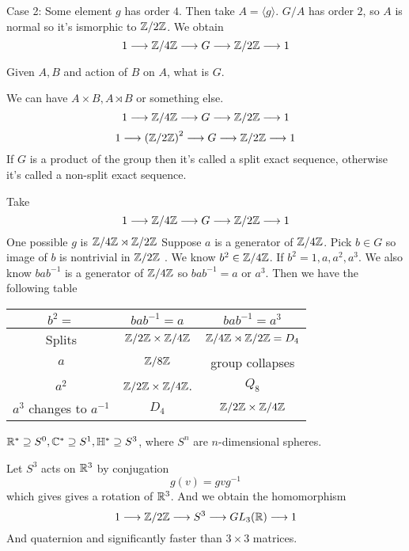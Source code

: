 Case 2: Some element $g$ has order $4$. Then take $A = \langle g \rangle$. $G/A$ has order $2$, so $A$ is normal so it's ismorphic to $\mathbb Z/ 2 \mathbb Z$. We obtain
\[ 1 \longrightarrow \mathbb Z/ 4 \mathbb Z \longrightarrow G \longrightarrow \mathbb Z/ 2 \mathbb Z \longrightarrow 1\]
\begin{problem}
	Given $A,B$ and action of $B$ on $A$, what is $G$.
\end{problem}
\begin{answer}
	We can have $A \times B, A \rtimes B$ or something else.
	\[ 1 \longrightarrow \mathbb Z/ 4 \mathbb Z \longrightarrow G \longrightarrow \mathbb Z/ 2 \mathbb Z \longrightarrow 1\]
	\[ 1 \longrightarrow \left( \mathbb Z/ 2 \mathbb Z \right)^2  \longrightarrow G \longrightarrow \mathbb Z/ 2 \mathbb Z \longrightarrow 1\]
	If $G$ is a product of the group then it's called a split exact sequence, otherwise it's called a non-split exact sequence.
\end{answer}
Take \[ 1 \longrightarrow  \mathbb Z/ 4 \mathbb Z   \longrightarrow G \longrightarrow \mathbb Z/ 2 \mathbb Z \longrightarrow 1\]
One possible $g$ is $\mathbb Z/ 4 \mathbb Z \rtimes \mathbb Z/ 2 \mathbb Z $
Suppose $a$ is a generator of $\mathbb Z/ 4 \mathbb Z$. Pick $b \in G$ so image of $b$ is nontrivial in $\mathbb Z/ 2 \mathbb Z $ . We know $b^2 \in \mathbb Z/ 4 \mathbb Z$. If $b^2 = 1,a,a^2,a^3$. We also know $bab^{-1}$ is a generator of $\mathbb Z/ 4 \mathbb Z$ so $bab^{-1} = a$ or $a^3$. Then we have the following table 


\begin{center}
	\begin{tabular}{c|c|c}
	$b^2 = $ & $bab^{-1} = a$ & $bab^{-1} = a^{3}$ \\
	\hline
	Splits & $\mathbb Z/ 2 \mathbb Z \times \mathbb Z/ 4 \mathbb Z$ & $\mathbb Z/ 4 \mathbb Z \rtimes \mathbb Z/ 2 \mathbb Z = D_4$ \\
	$a$ & $\mathbb Z/ 8 \mathbb Z$ & group collapses \\
	$a^2$ & $\mathbb Z/ 2 \mathbb Z \times \mathbb Z/ 4 \mathbb Z$. & $Q_8$ \\
	$a^3$ changes to $a^{-1}$ & $D_4$ & $\mathbb Z/ 2 \mathbb Z \times \mathbb Z/ 4 \mathbb Z $
\end{tabular}
\end{center}
\begin{remark}
	$\mathbb R^* \supseteq S^0, \mathbb C^* \supseteq S^1, \mathbb H^* \supseteq S^3$, where $S^n$ are $n$-dimensional spheres.
\end{remark}
\begin{remark}
	Let $S^3$ acts on $\mathbb R^3$ by conjugation
	\[g(v) = gvg^{-1}\] which gives gives a rotation of $\mathbb R^3$. And we obtain the homomorphism
	\[ 1 \longrightarrow \mathbb Z/ 2 \mathbb Z \longrightarrow S^3 \longrightarrow GL_3(\mathbb R) \longrightarrow 1\]
	And quaternion and significantly faster than $3 \times 3$ matrices.
\end{remark}